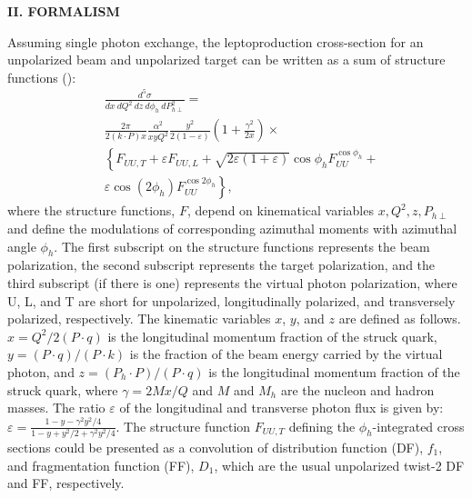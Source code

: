 \documentclass[aps,prl,twocolumn,showpacs,superscriptaddress,groupedaddress]{revtex4-1}  %
\newcommand{\zh}{z}
\newcommand{\xbj}{x}
\begin{document}
\begin{center}
\textbf{II. FORMALISM} \par
\end{center}
Assuming single photon exchange, the leptoproduction cross-section for an unpolarized beam and unpolarized target can be written as a sum of structure functions (\cite{Bacchetta:2006tn}):
\begin{equation}
\label{eq:crosssection3}
\begin{split}
& \frac{d^{5} \sigma}{dx\ dQ^2\ dz\ d \phi_{h}\ dP_{h \perp}^{2}} =
\\
& \frac{2\pi}{2(k\cdot P)x} \frac{\alpha^{2}}{xyQ^{2}} \frac{y^{2}}{2 \left( 1 - \varepsilon \right)} \left( 1 + \frac{\gamma^{2}}{2x} \right) \times
\\
& \left\{ F_{UU,T} + \varepsilon F_{UU,L} + \sqrt{2 \varepsilon \left( 1 + \varepsilon \right)} \cos \phi_{h} F^{\cos \phi_{h}}_{UU} + \right.
\\
& \left. \varepsilon \cos \left( 2 \phi_{h} \right) F_{UU}^{\cos2\phi_{h}} \right\},
\end{split}
\end{equation}
where the structure functions, $F$, depend on kinematical variables $x,Q^2,z,P_{h\perp}$ and define the modulations of corresponding azimuthal moments with azimuthal angle $\phi_{h}$.
The first subscript on the structure functions represents the beam polarization, the second subscript represents the target polarization, and the third subscript (if there is one) represents the virtual photon polarization, where U, L, and T are short for unpolarized, longitudinally polarized, and transversely polarized, respectively.
The kinematic variables $\xbj$, $y$, and $z$  are defined as follows.
$\xbj = Q^2/{2(P\cdot q)}$ is the longitudinal momentum fraction of the struck quark, 
$y={(P \cdot q)/(P \cdot k)}$ is the fraction of the beam energy carried by the virtual photon,
and $\zh=(P_h \cdot P)/(P \cdot q)$ is the longitudinal momentum fraction of the struck quark, 
where $\gamma=2M\xbj /Q$ and $M$ and $M_h$ are the nucleon and hadron masses.
The ratio $\varepsilon$ of the longitudinal and transverse photon flux is given by: $\varepsilon=\frac{1-y-\gamma^2y^2/4}{1-y+y^2/2+\gamma^2y^2/4}$.
The structure function  $F_{UU,T}$  defining the $\phi_h$-integrated cross sections could be presented as a convolution of  distribution function (DF), $f_1$,   and fragmentation function (FF), $D_1$, which  are the usual unpolarized twist-2 DF and FF, respectively. 
\end{document}
